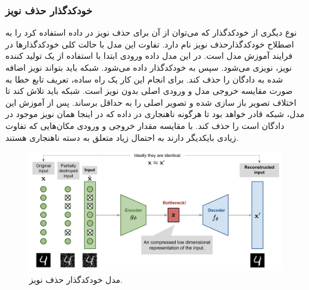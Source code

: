 \documentclass[12pt,a4paper]{report}
\begin{document}
\subsubsection{خودکدگذار حذف نویز}
نوع دیگری از خودکدگذار که می‌توان از آن برای حذف نویز در داده استفاده کرد را به اصطلاح خودکدگذارحذف نویز نام دارد. تفاوت این مدل با حالت کلی خودکدگذار‌ها در فرایند آموزش مدل است. در این مدل داده ورودی ابتدا با استفاده از یک تولید کننده نویز، نویزی می‌شود. سپس به خودکدگذار داده می‌شود. شبکه باید بتواند نویز اضافه شده به دادگان را حذف کند. برای انجام این کار یک راه ساده، تعریف تابع خطا به صورت مقایسه خروجی مدل و ورودی اصلی بدون نویز است. شبکه باید تلاش کند تا اختلاف تصویر باز سازی شده و تصویر اصلی را به حداقل برساند. پس از آموزش این مدل، شبکه قادر خواهد بود تا هرگونه ناهنجاری در داده که در اینجا همان نویز موجود در دادگان است را حذف کند. با مقایسه مقدار خروجی و ورودی مکان‌هایی که تفاوت زیادی بایکدیگر دارند به احتمال زیاد متعلق به دسته ناهنجاری هستند.

\begin{figure}[!h]
	\begin{center}
		\includegraphics[width=\linewidth]{./images/figures/dae.png}
	\end{center}
	\caption{مدل خودکدگذار حذف نویز\cite{fromaetovae}.}
	\label{fig:dae}
	\centering
\end{figure}
\end{document}
